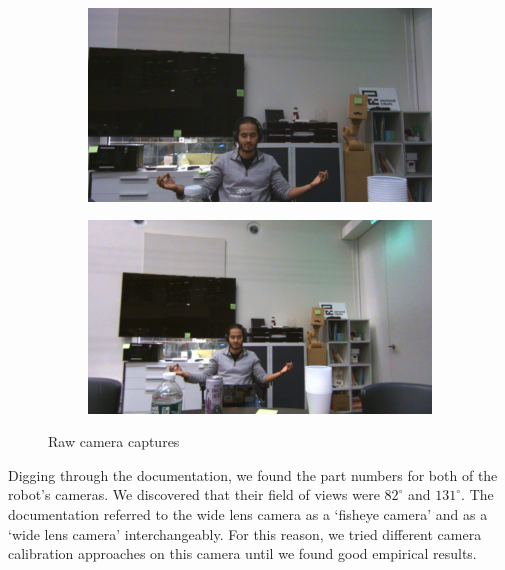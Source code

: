\documentclass[12pt,letterpaper]{article}
\begin{document}
\begin{figure}[ht]
	\centering
	\begin{subfigure}[c]{0.4\linewidth} 
		\includegraphics[width=\linewidth]{./images/pinhole_9.png}
	\end{subfigure}
	\begin{subfigure}[c]{0.4\linewidth}
		\includegraphics[width=\linewidth]{./images/fisheye_9.png}
	\end{subfigure}
	\caption{Raw camera captures}
	\label{raw_captures}
\end{figure}

Digging through the documentation, we found the part numbers for both of the robot's cameras. We discovered that their field of views were $82^\circ$ and $131^\circ$. The documentation referred to the wide lens camera as a `fisheye camera' and as a `wide lens camera' interchangeably. For this reason, we tried different camera calibration approaches on this camera until we found good empirical results.
\end{document}
